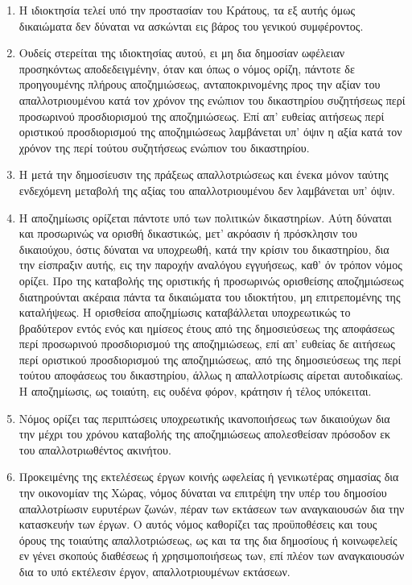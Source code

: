 \documentclass[twoside, a4paper, 10pt]{article}
\begin{document}
\begin{multicols}{2}
\begin{enumerate}
\begin{BigQuote}
\begin{enumerate}
  \item[1.] Η ιδιοκτησία τελεί υπό την προστασίαν του Κράτους, τα εξ αυτής όμως δικαιώματα δεν δύναται να ασκώνται εις βάρος του γενικού συμφέροντος.
  \item[2.] Ουδείς στερείται της ιδιοκτησίας αυτού, ει μη δια δημοσίαν ωφέλειαν προσηκόντως αποδεδειγμένην, όταν και όπως ο νόμος ορίζη, πάντοτε δε προηγουμένης πλήρους αποζημιώσεως, ανταποκρινομένης προς την αξίαν του απαλλοτριουμένου κατά τον χρόνον της ενώπιον του δικαστηρίου συζητήσεως περί προσωρινού προσδιορισμού της αποζημιώσεως. Επί απ' ευθείας αιτήσεως περί οριστικού προσδιορισμού της αποζημιώσεως λαμβάνεται υπ' όψιν η αξία κατά τον χρόνον της περί τούτου συζητήσεως ενώπιον του δικαστηρίου.
  \item[3.] Η μετά την δημοσίευσιν της πράξεως απαλλοτριώσεως και ένεκα μόνον ταύτης ενδεχόμενη μεταβολή της αξίας του απαλλοτριουμένου δεν λαμβάνεται υπ' όψιν.
  \item[4.] Η αποζημίωσις ορίζεται πάντοτε υπό των πολιτικών δικαστηρίων. Αύτη δύναται και προσωρινώς να ορισθή δικαστικώς, μετ' ακρόασιν ή πρόσκλησιν του δικαιούχου, όστις δύναται να υποχρεωθή, κατά την κρίσιν του δικαστηρίου, δια την είσπραξιν αυτής, εις την παροχήν αναλόγου εγγυήσεως, καθ' όν τρόπον νόμος ορίζει.
Προ της καταβολής της οριστικής ή προσωρινώς ορισθείσης αποζημιώσεως διατηρούνται ακέραια πάντα τα δικαιώματα του ιδιοκτήτου, μη επιτρεπομένης της καταλήψεως.
Η ορισθείσα αποζημίωσις καταβάλλεται υποχρεωτικώς το βραδύτερον εντός ενός και ημίσεος έτους από της δημοσιεύσεως της αποφάσεως περί προσωρινού προσδιορισμού της αποζημιώσεως, επί απ' ευθείας δε αιτήσεως περί οριστικού προσδιορισμού της αποζημιώσεως, από της δημοσιεύσεως της περί τούτου αποφάσεως του δικαστηρίου, άλλως η απαλλοτρίωσις αίρεται αυτοδικαίως.
Η αποζημίωσις, ως τοιαύτη, εις ουδένα φόρον, κράτησιν ή τέλος υπόκειται.
  \item[5.] Νόμος ορίζει τας περιπτώσεις υποχρεωτικής ικανοποιήσεως των δικαιούχων δια την μέχρι του χρόνου καταβολής της αποζημιώσεως απολεσθείσαν πρόσοδον εκ του απαλλοτριωθέντος ακινήτου.
  \item[6.] Προκειμένης της εκτελέσεως έργων κοινής ωφελείας ή γενικωτέρας σημασίας δια την οικονομίαν της Χώρας, νόμος δύναται να επιτρέψη την υπέρ του δημοσίου απαλλοτρίωσιν ευρυτέρων ζωνών, πέραν των εκτάσεων των αναγκαιουσών δια την κατασκευήν των έργων. Ο αυτός νόμος καθορίζει τας προϋποθέσεις και τους όρους της τοιαύτης απαλλοτριώσεως, ως και τα της δια δημοσίους ή κοινωφελείς εν γένει σκοπούς διαθέσεως ή χρησιμοποιήσεως των, επί πλέον των αναγκαιουσών δια το υπό εκτέλεσιν έργον, απαλλοτριουμένων εκτάσεων.

\end{enumerate}
\end{BigQuote}
\end{enumerate}
\end{multicols}
\end{document}
